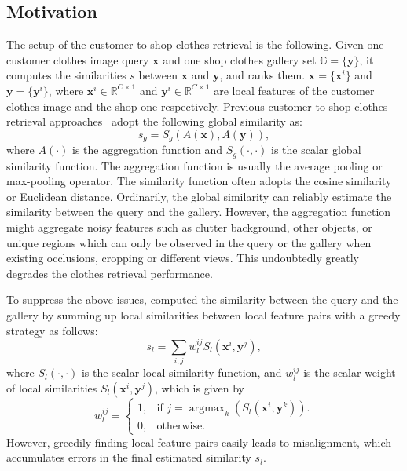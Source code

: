 \documentclass[10pt,twocolumn,letterpaper]{article}
\DeclareMathOperator*{\argmaxB}{argmax}
\begin{document}
\subsection{Motivation}
The setup of the customer-to-shop clothes retrieval is the following. Given one customer clothes image query $\mathbf{x}$ and one shop clothes gallery set $\mathbb{G}=\{\mathbf{y}\}$, it computes the similarities $s$ between $\mathbf{x}$ and $\mathbf{y}$, and ranks them. $\mathbf{x}=\{\mathbf{x}^i\}$ and $\mathbf{y}=\{\mathbf{y}^i\}$, where $\mathbf{x}^i\in \mathbb{R}^{C\times 1}$ and $\mathbf{y}^i\in \mathbb{R}^{C\times 1}$ are local features of the customer clothes image and the shop one respectively. Previous customer-to-shop clothes retrieval approaches~\cite{Huang2015,Kiapour2015,Liu2016,Ji2017,Song2017,Corbiere2017,Garcia2017,Cheng2017,Zhang2018}  adopt the following global similarity as:
\begin{equation}
s_g=S_g(A(\mathbf{x}),A(\mathbf{y})),
\label{eq:eq_g}
\end{equation}
where $A(\cdot)$ is the aggregation function and $S_g(\cdot,\cdot)$ is the scalar global similarity function. The aggregation function is usually the average pooling or max-pooling operator. The similarity function often adopts the cosine similarity or Euclidean distance. Ordinarily, the global similarity can reliably estimate the similarity between the query and the gallery. However, the aggregation function might aggregate noisy features such as clutter background, other objects, or unique regions which can only be observed in the query or the gallery when existing occlusions, cropping or different views. This undoubtedly greatly degrades the clothes retrieval performance.

To suppress the above issues, \cite{Wallraven2003,Boughorbel2014} computed the similarity between the query and the gallery by summing up local similarities between local feature pairs with a greedy strategy as follows:
\begin{equation}
s_l=\sum\limits_{i,j}{w_{l}^{ij}S_l(\mathbf{x}^i,\mathbf{y}^j)},
\label{eq:eq_ls}
\end{equation}
where $S_l(\cdot,\cdot)$ is the scalar local similarity function, and $w_{l}^{ij}$ is the scalar weight of local similarities $S_l(\mathbf{x}^i,\mathbf{y}^j)$, which is given by
\begin{equation}
 w_{l}^{ij}=\begin{cases}
    1, & \text{if $j=\argmaxB_k(S_l(\mathbf{x}^i,\mathbf{y}^k))$}.\\
    0, & \text{otherwise}.
  \end{cases}
\end{equation}
 However, greedily finding local feature pairs easily leads to misalignment, which accumulates errors in the final estimated similarity $s_l$.
\end{document}
